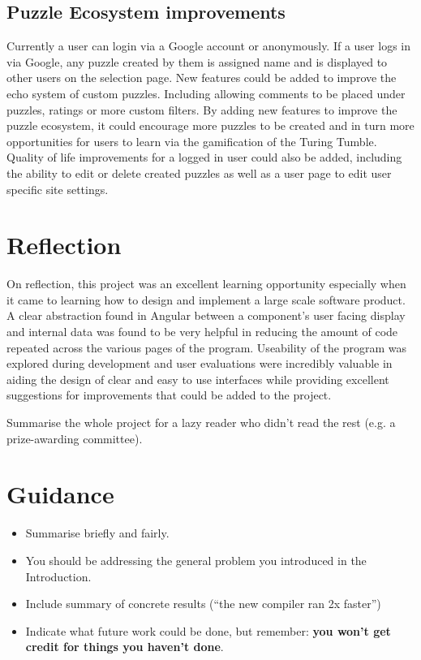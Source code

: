 \documentclass{l4proj}
\begin{document}
\subsection{Puzzle Ecosystem improvements}
Currently a user can login via a Google account or anonymously. If a user logs in via Google, any puzzle created by them is assigned name and is displayed to other users on the selection page. New features could be added to improve the echo system of custom puzzles. Including allowing comments to be placed under puzzles, ratings or more custom filters. By adding new features to improve the puzzle ecosystem, it could encourage more puzzles to be created and in turn more opportunities for users to learn via the gamification of the Turing Tumble. Quality of life improvements for a logged in user could also be added, including the ability to edit or delete created puzzles as well as a user page to edit user specific site settings.

\section{Reflection}
On reflection, this project was an excellent learning opportunity especially when it came to learning how to design and implement a large scale software product. A clear abstraction found in Angular between a component's user facing display and internal data was found to be very helpful in reducing the amount of code repeated across the various pages of the program. Useability of the program was explored during development and user evaluations were incredibly valuable in aiding the design of clear and easy to use interfaces while providing excellent suggestions for improvements that could be added to the project.

Summarise the whole project for a lazy reader who didn't read the rest (e.g. a prize-awarding committee).
\section{Guidance}
\begin{itemize}
    \item
          Summarise briefly and fairly.
    \item
          You should be addressing the general problem you introduced in the
          Introduction.        
    \item
          Include summary of concrete results (``the new compiler ran 2x
          faster'')
    \item
          Indicate what future work could be done, but remember: \textbf{you
              won't get credit for things you haven't done}.
\end{itemize}
\end{document}
